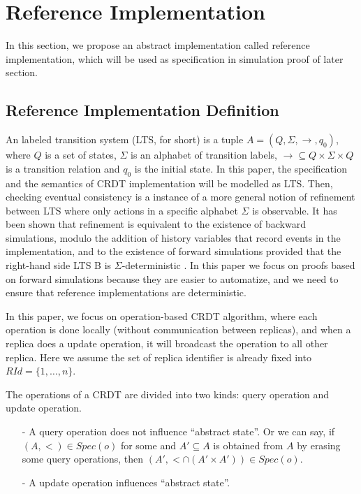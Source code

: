 
\section{Reference Implementation}
\label{sec:reference implementation}

In this section, we propose an abstract implementation called reference implementation, which will be used as specification in simulation proof of later section.


\subsection{Reference Implementation Definition}
\label{subsec:reference implementation definition} 

An labeled transition system (LTS, for short) is a tuple $A = (Q,\Sigma,\rightarrow,q_0)$, where $Q$ is a set of states, $\Sigma$ is an alphabet of transition labels, $\rightarrow \subseteq Q \times \Sigma \times Q$ is a transition relation and $q_0$ is the initial state. In this paper, the specification and the semantics of CRDT implementation will be modelled as LTS. Then, checking eventual consistency is a instance of a more general notion of refinement between LTS where only actions in a specific alphabet $\Sigma$ is observable. It has been shown that refinement is equivalent to the existence of backward simulations, modulo the addition of history variables that record events in the implementation, and to the existence of forward simulations provided that the right-hand side LTS B is $\Sigma$-deterministic \cite{Abadi:1991,Lynch:1995}. In this paper we focus on proofs based on forward simulations because they are easier to automatize, and we need to ensure that reference implementations are deterministic. 

In this paper, we focus on operation-based CRDT algorithm, where each operation is done locally (without communication between replicas), and when a replica does a update operation, it will broadcast the operation to all other replica. Here we assume the set of replica identifier is already fixed into $RId=\{1,\ldots,n\}$. 

The operations of a CRDT are divided into two kinds: query operation and update operation. 

\begin{itemize}
\setlength{\itemsep}{0.5pt}
\item[-] A query operation does not influence ``abstract state''. Or we can say, if $(A,<) \in Spec(o)$ for some and $A' \subseteq A$ is obtained from $A$ by erasing some query operations, then $(A',< \cap (A' \times A')) \in Spec(o)$. 

\item[-] A update operation influences ``abstract state''. 
\end{itemize} 

